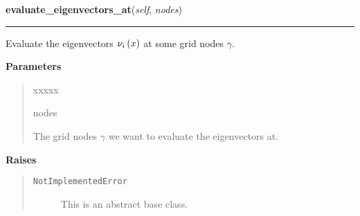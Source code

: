 \hspace{.8\funcindent}\begin{boxedminipage}{\funcwidth}

    \raggedright \textbf{evaluate\_eigenvectors\_at}(\textit{self}, \textit{nodes})

    \vspace{-1.5ex}

    \rule{\textwidth}{0.5\fboxrule}
\setlength{\parskip}{2ex}
    Evaluate the eigenvectors $\nu_i\left( x \right)$ at some
    grid nodes $\gamma$.

\setlength{\parskip}{1ex}
      \textbf{Parameters}
      \vspace{-1ex}

      \begin{quote}
        \begin{Ventry}{xxxxx}

          \item[nodes]

          The grid nodes $\gamma$ we want to evaluate the
          eigenvectors at.

        \end{Ventry}

      \end{quote}

      \textbf{Raises}
    \vspace{-1ex}

      \begin{quote}
        \begin{description}

          \item[\texttt{NotImplementedError}]

          This is an abstract base class.

        \end{description}

      \end{quote}

    \end{boxedminipage}

    \label{MatrixPotential:MatrixPotential:project_to_eigen}

    \vspace{0.5ex}


